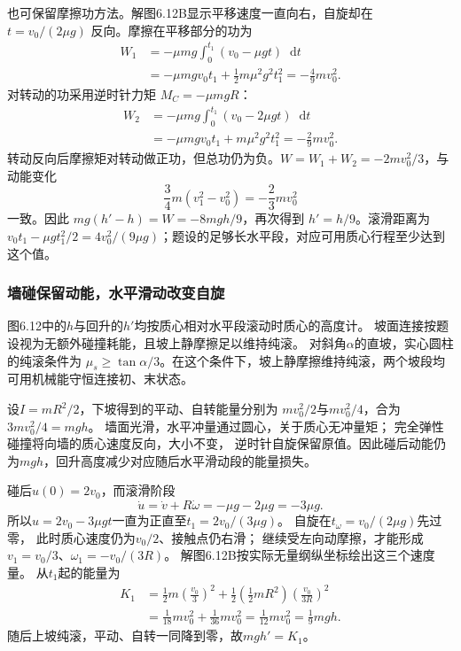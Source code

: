 \documentclass[UTF8,fontset=fandol,a4paper,11pt]{ctexart}
\newcommand{\dd}{\mathop{}\!\mathrm{d}}
\begin{document}
也可保留摩擦功方法。解图6.12B显示平移速度一直向右，自旋却在 $t=v_0/(2\mu g)$ 反向。摩擦在平移部分的功为
\[
\begin{aligned}
 W_1&=-\mu mg\int_0^{t_1}(v_0-\mu gt)\dd t\\
 &=-\mu mgv_0t_1+\frac12m\mu^2g^2t_1^2
 =-\frac49mv_0^2.
\end{aligned}
\]
对转动的功采用逆时针力矩 $M_C=-\mu mgR$：
\[
\begin{aligned}
 W_2&=-\mu mg\int_0^{t_1}(v_0-2\mu gt)\dd t\\
 &=-\mu mgv_0t_1+m\mu^2g^2t_1^2=-\frac29mv_0^2.
\end{aligned}
\]
转动反向后摩擦矩对转动做正功，但总功仍为负。$W=W_1+W_2=-2mv_0^2/3$，与动能变化
\[
 \frac34m(v_1^2-v_0^2)=-\frac23mv_0^2
\]
一致。因此 $mg(h'-h)=W=-8mgh/9$，再次得到 $h'=h/9$。滚滑距离为 $v_0t_1-\mu gt_1^2/2=4v_0^2/(9\mu g)$；题设的足够长水平段，对应可用质心行程至少达到这个值。
\subsubsection*{墙碰保留动能，水平滑动改变自旋}
图6.12中的$h$与回升的$h'$均按质心相对水平段滚动时质心的高度计。
坡面连接按题设视为无额外碰撞耗能，且坡上静摩擦足以维持纯滚。
对斜角$\alpha$的直坡，实心圆柱的纯滚条件为
$\mu_s\geq\tan\alpha/3$。在这个条件下，坡上静摩擦维持纯滚，两个坡段均可用机械能守恒连接初、末状态。

设$I=mR^2/2$，下坡得到的平动、自转能量分别为
$mv_0^2/2$与$mv_0^2/4$，合为$3mv_0^2/4=mgh$。
墙面光滑，水平冲量通过圆心，关于质心无冲量矩；
完全弹性碰撞将向墙的质心速度反向，大小不变，
逆时针自旋保留原值。因此碰后动能仍为$mgh$，回升高度减少对应随后水平滑动段的能量损失。

碰后$u(0)=2v_0$，而滚滑阶段
\[
\dot u=\dot v+R\dot\omega=-\mu g-2\mu g=-3\mu g.
\]
所以$u=2v_0-3\mu gt$一直为正直至$t_1=2v_0/(3\mu g)$。
自旋在$t_\omega=v_0/(2\mu g)$先过零，
此时质心速度仍为$v_0/2$、接触点仍右滑；
继续受左向动摩擦，才能形成$v_1=v_0/3$、$\omega_1=-v_0/(3R)$。
解图6.12B按实际无量纲纵坐标绘出这三个速度量。
从$t_1$起的能量为
\[
\begin{aligned}
K_1&=\frac12m\left(\frac{v_0}{3}\right)^2
+\frac12\left(\frac12mR^2\right)\left(\frac{v_0}{3R}\right)^2\\
&=\frac1{18}mv_0^2+\frac1{36}mv_0^2
=\frac1{12}mv_0^2=\frac19mgh.
\end{aligned}
\]
随后上坡纯滚，平动、自转一同降到零，故$mgh'=K_1$。
\end{document}
